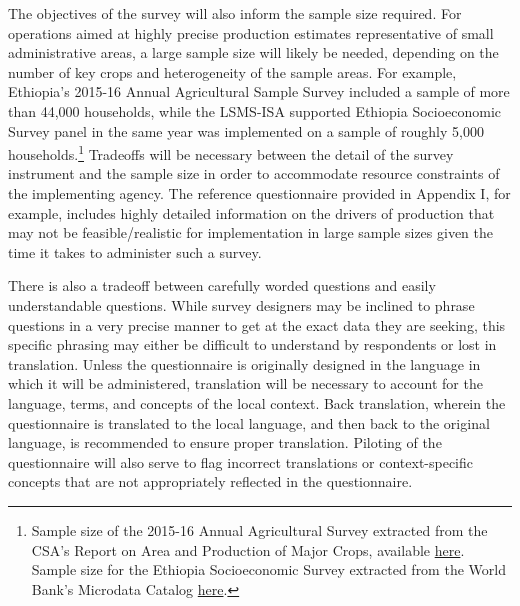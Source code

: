 \documentclass[
]{book}
\begin{document}
The objectives of the survey will also inform the sample size required. For operations aimed at highly precise production estimates representative of small administrative areas, a large sample size will likely be needed, depending on the number of key crops and heterogeneity of the sample areas. For example, Ethiopia's 2015-16 Annual Agricultural Sample Survey included a sample of more than 44,000 households, while the LSMS-ISA supported Ethiopia Socioeconomic Survey panel in the same year was implemented on a sample of roughly 5,000 households.\footnote{Sample size of the 2015-16 Annual Agricultural Survey extracted from the CSA's Report on Area and Production of Major Crops, available \href{http://www.csa.gov.et/survey-report/category/347-eth-agss-2016}{here}. Sample size for the Ethiopia Socioeconomic Survey extracted from the World Bank's Microdata Catalog \href{https://microdata.worldbank.org/index.php/catalog/2783}{here}.} Tradeoffs will be necessary between the detail of the survey instrument and the sample size in order to accommodate resource constraints of the implementing agency. The reference questionnaire provided in Appendix I, for example, includes highly detailed information on the drivers of production that may not be feasible/realistic for implementation in large sample sizes given the time it takes to administer such a survey.

There is also a tradeoff between carefully worded questions and easily understandable questions. While survey designers may be inclined to phrase questions in a very precise manner to get at the exact data they are seeking, this specific phrasing may either be difficult to understand by respondents or lost in translation. Unless the questionnaire is originally designed in the language in which it will be administered, translation will be necessary to account for the language, terms, and concepts of the local context. Back translation, wherein the questionnaire is translated to the local language, and then back to the original language, is recommended to ensure proper translation. Piloting of the questionnaire will also serve to flag incorrect translations or context-specific concepts that are not appropriately reflected in the questionnaire.
\end{document}
